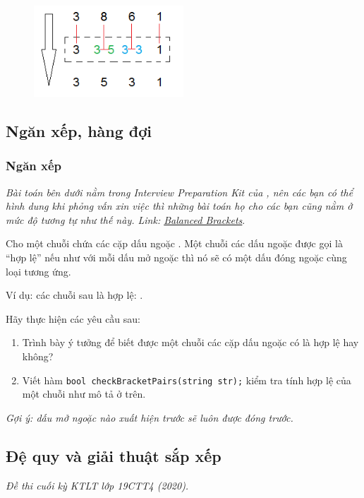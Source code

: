 \documentclass[main.tex]{subfiles}
\begin{document}
\begin{figure}[H]
\centering
\includegraphics[width=0.5\textwidth]{image/q_DSLK.png}
\end{figure}
\subsection{Ngăn xếp, hàng đợi}
\subsubsection{Ngăn xếp}
\textit{Bài toán bên dưới nằm trong Interview Preparation Kit của , nên các bạn có thể hình dung khi phỏng vấn xin việc thì những bài toán họ cho các bạn cũng nằm ở mức độ tương tự như thế này. Link: \href{https://www.hackerrank.com/challenges/balanced-brackets/}{Balanced Brackets}}.

Cho một chuỗi chứa các cặp dấu ngoặc \code{() [] {}}. Một chuỗi các dấu ngoặc được gọi là ``hợp lệ'' nếu như với mỗi dấu mở ngoặc thì nó sẽ có một dấu đóng ngoặc cùng loại tương ứng.

Ví dụ: các chuỗi sau là hợp lệ: . 

Hãy thực hiện các yêu cầu sau:
\begin{enumerate}[label=\alph*.]
    \item Trình bày ý tưởng để biết được một chuỗi các cặp dấu ngoặc có là hợp lệ hay không?
    \item Viết hàm \texttt{bool checkBracketPairs(string str);} kiểm tra tính hợp lệ của một chuỗi như mô tả ở trên.
\end{enumerate}
\textit{Gợi ý: dấu mở ngoặc nào xuất hiện trước sẽ luôn được đóng trước.}

\subsection{Đệ quy và giải thuật sắp xếp}
\textit{Đề thi cuối kỳ KTLT lớp 19CTT4 (2020).}
\end{document}
